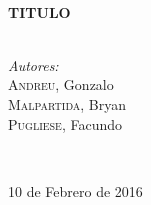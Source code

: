 \begin{titlepage}
\HRule \\[0.4cm]
{ \huge \bfseries TITULO }\\[0.4cm] %
\HRule \\[1.5cm]
 

\begin{minipage}{0.4\textwidth}
\begin{center} \large
\emph{Autores:}\\
\textsc{Andreu}, Gonzalo\\ %
\textsc{Malpartida}, Bryan\\ %
\textsc{Pugliese}, Facundo\\ %


\end{center}
\end{minipage}
~



\vspace{\fill}

{\large 10 de Febrero de 2016}\\[5cm] %


 

\vfill %

\end{titlepage}
%